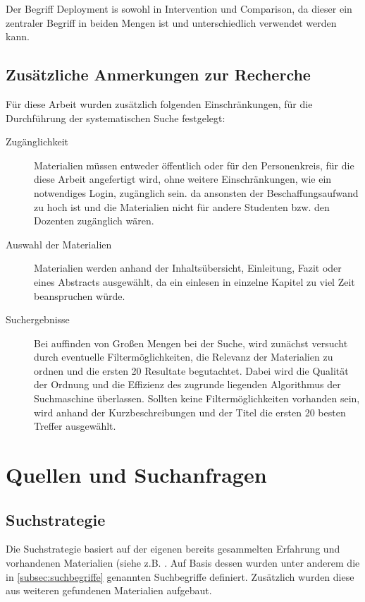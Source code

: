 \noindent
Der Begriff Deployment is sowohl in Intervention und Comparison, da dieser ein zentraler Begriff in beiden Mengen ist und unterschiedlich verwendet werden kann.

\subsection{Zusätzliche Anmerkungen zur Recherche}
\label{subsec:zusätzlicheAnmerkungenZurRecherce}
Für diese Arbeit wurden zusätzlich folgenden Einschränkungen, für die Durchführung der systematischen Suche festgelegt:

\begin{description}
	\item[Zugänglichkeit] Materialien müssen entweder öffentlich oder für den Personenkreis, für die diese Arbeit angefertigt wird, ohne weitere Einschränkungen, wie ein notwendiges Login, zugänglich sein. da ansonsten der Beschaffungsaufwand zu hoch ist und die Materialien nicht für andere Studenten bzw. den Dozenten zugänglich wären.
	\item[Auswahl der Materialien] Materialien werden anhand der Inhaltsübersicht, Einleitung, Fazit oder eines Abstracts ausgewählt, da ein einlesen in einzelne Kapitel zu viel Zeit beanspruchen würde.
	\item[Suchergebnisse] Bei auffinden von Großen Mengen bei der Suche, wird zunächst versucht durch eventuelle Filtermöglichkeiten, die Relevanz der Materialien zu ordnen und die ersten 20 Resultate begutachtet. Dabei wird die Qualität der Ordnung und die Effizienz des zugrunde liegenden Algorithmus der Suchmaschine überlassen. Sollten keine Filtermöglichkeiten vorhanden sein, wird anhand der Kurzbeschreibungen und der Titel die ersten 20 besten Treffer ausgewählt.
\end{description}

\section{Quellen und Suchanfragen}
\label{sec:QuellenUndSuchanfragen}

\subsection{Suchstrategie}
\label{subsec:suchstrategie}
Die Suchstrategie basiert auf der eigenen bereits gesammelten Erfahrung und vorhandenen Materialien (siehe z.B. \cite{EWolff:CD}. Auf Basis dessen wurden unter anderem die in \ref{subsec:suchbegriffe}  genannten Suchbegriffe definiert. Zusätzlich wurden diese aus weiteren gefundenen Materialien aufgebaut.

